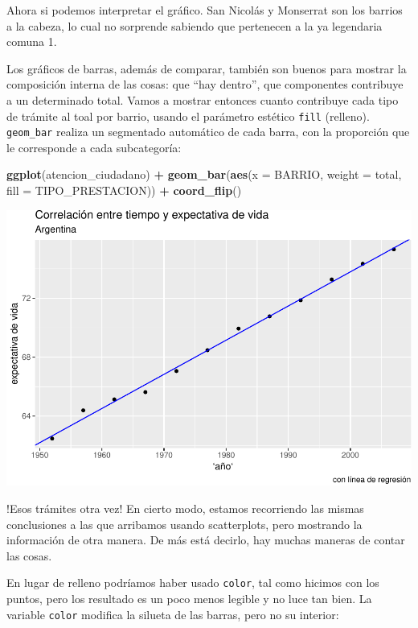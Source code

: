 \documentclass[]{book}
\newenvironment{Shaded}{\begin{snugshade}}{\end{snugshade}}
\newcommand{\KeywordTok}[1]{\textcolor[rgb]{0.13,0.29,0.53}{\textbf{#1}}}
\newcommand{\DataTypeTok}[1]{\textcolor[rgb]{0.13,0.29,0.53}{#1}}
\newcommand{\StringTok}[1]{\textcolor[rgb]{0.31,0.60,0.02}{#1}}
\newcommand{\OperatorTok}[1]{\textcolor[rgb]{0.81,0.36,0.00}{\textbf{#1}}}
\newcommand{\NormalTok}[1]{#1}
\begin{document}
Ahora si podemos interpretar el gráfico. San Nicolás y Monserrat son los
barrios a la cabeza, lo cual no sorprende sabiendo que pertenecen a la
ya legendaria comuna 1.

Los gráficos de barras, además de comparar, también son buenos para
mostrar la composición interna de las cosas: que ``hay dentro'', que
componentes contribuye a un determinado total. Vamos a mostrar entonces
cuanto contribuye cada tipo de trámite al toal por barrio, usando el
parámetro estético \texttt{fill} (relleno). \texttt{geom\_bar} realiza
un segmentado automático de cada barra, con la proporción que le
corresponde a cada subcategoría:

\begin{Shaded}
\begin{Highlighting}[]
\KeywordTok{ggplot}\NormalTok{(atencion_ciudadano) }\OperatorTok{+}
\StringTok{    }\KeywordTok{geom_bar}\NormalTok{(}\KeywordTok{aes}\NormalTok{(}\DataTypeTok{x =}\NormalTok{ BARRIO, }\DataTypeTok{weight =}\NormalTok{ total, }\DataTypeTok{fill =}\NormalTok{ TIPO_PRESTACION)) }\OperatorTok{+}
\StringTok{    }\KeywordTok{coord_flip}\NormalTok{()}
\end{Highlighting}
\end{Shaded}

\includegraphics{ciencia_de_datos_politicas_publicas_files/figure-latex/unnamed-chunk-95-1.pdf}

!Esos trámites otra vez! En cierto modo, estamos recorriendo las mismas
conclusiones a las que arribamos usando scatterplots, pero mostrando la
información de otra manera. De más está decirlo, hay muchas maneras de
contar las cosas.

En lugar de relleno podríamos haber usado \texttt{color}, tal como
hicimos con los puntos, pero los resultado es un poco menos legible y no
luce tan bien. La variable \texttt{color} modifica la silueta de las
barras, pero no su interior:
\end{document}

